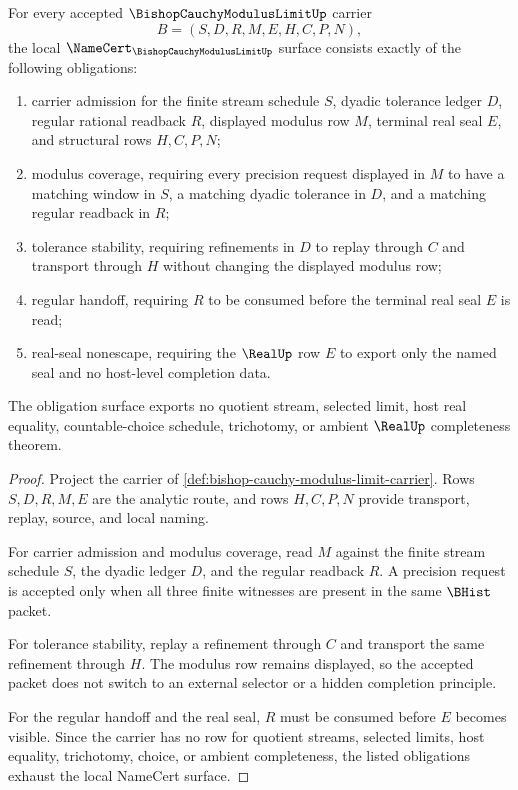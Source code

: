 \begin{theorem}
\label{thm:bishop-cauchy-modulus-limit-namecert-obligations}
For every accepted $\BishopCauchyModulusLimitUp$ carrier
$$
B=(S,D,R,M,E,H,C,P,N),
$$
the local $\NameCert_{\BishopCauchyModulusLimitUp}$ surface consists exactly of the following obligations:
\begin{enumerate}
\item carrier admission for the finite stream schedule $S$, dyadic tolerance ledger $D$, regular rational readback $R$, displayed modulus row $M$, terminal real seal $E$, and structural rows $H,C,P,N$;
\item modulus coverage, requiring every precision request displayed in $M$ to have a matching window in $S$, a matching dyadic tolerance in $D$, and a matching regular readback in $R$;
\item tolerance stability, requiring refinements in $D$ to replay through $C$ and transport through $H$ without changing the displayed modulus row;
\item regular handoff, requiring $R$ to be consumed before the terminal real seal $E$ is read;
\item real-seal nonescape, requiring the $\RealUp$ row $E$ to export only the named seal and no host-level completion data.
\end{enumerate}
The obligation surface exports no quotient stream, selected limit, host real equality, countable-choice schedule, trichotomy, or ambient $\RealUp$ completeness theorem.
\end{theorem}
\begin{proof}
Project the carrier of \autoref{def:bishop-cauchy-modulus-limit-carrier}. Rows $S,D,R,M,E$ are the analytic route, and rows $H,C,P,N$ provide transport, replay, source, and local naming.

For carrier admission and modulus coverage, read $M$ against the finite stream schedule $S$, the dyadic ledger $D$, and the regular readback $R$. A precision request is accepted only when all three finite witnesses are present in the same $\BHist$ packet.

For tolerance stability, replay a refinement through $C$ and transport the same refinement through $H$. The modulus row remains displayed, so the accepted packet does not switch to an external selector or a hidden completion principle.

For the regular handoff and the real seal, $R$ must be consumed before $E$ becomes visible. Since the carrier has no row for quotient streams, selected limits, host equality, trichotomy, choice, or ambient completeness, the listed obligations exhaust the local NameCert surface.
\end{proof}

